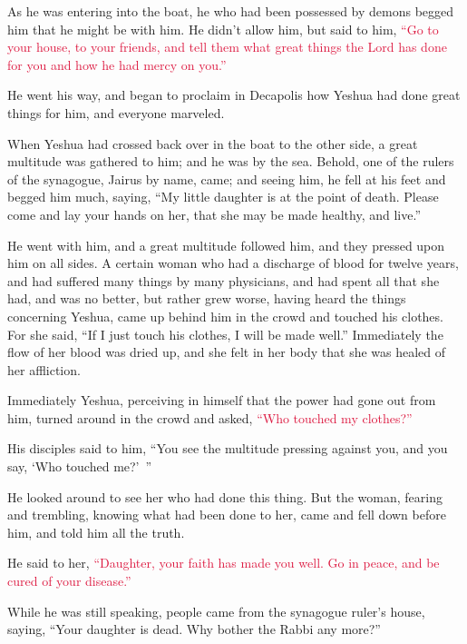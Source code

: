 \myverse{}As he was entering into the boat, he who had been possessed by
demons begged him that he might be with him.
\myverse{}He didn’t allow him, but said to him,
\textcolor{crimson}{“Go to your house, to your friends, and tell them what great things the Lord has done for you and
	how he had mercy on you.”}

\myverse{}He went his way, and began to proclaim in Decapolis how Yeshua
had done great things for him, and everyone marveled.

\myverse{}When Yeshua had crossed back over in the boat to the other side,
a great multitude was gathered to him; and he was by the sea.
\myverse{}Behold, one of the rulers of the synagogue, Jairus by name, came; and seeing
him, he fell at his feet
\myverse{}and begged him much, saying, “My little daughter is at the point of death.
Please come and lay your hands on her, that she may be made healthy, and live.”

\myverse{}He went with him, and a great multitude followed him, and they
pressed upon him on all sides.
\myverse{}A certain woman who had a discharge of blood for twelve years,
\myverse{}and had suffered many things by many physicians, and had spent all that she
had, and was no better, but rather grew worse,
\myverse{}having heard the things concerning Yeshua, came up behind him in the crowd
and touched his clothes.
\myverse{}For she said, “If I just touch his clothes, I will be made well.”
\myverse{}Immediately the flow of her blood was dried up, and she felt in her body that
she was healed of her affliction.

\myverse{}Immediately Yeshua, perceiving in himself that the power had
gone out from him, turned around in the crowd and asked,
\textcolor{crimson}{“Who touched my clothes?”}

\myverse{}His disciples said to him, “You see the multitude pressing against
you, and you say, ‘Who touched me?’ ”

\myverse{}He looked around to see her who had done this thing.
\myverse{}But the woman, fearing and trembling, knowing what had been done to her, came
and fell down before him, and told him all the truth.

\myverse{}He said to her,
\textcolor{crimson}{“Daughter, your faith has made you well. Go in peace, and be cured of your disease.”}

\myverse{}While he was still speaking, people came from the synagogue ruler’s
house, saying, “Your daughter is dead. Why bother the Rabbi any more?”

